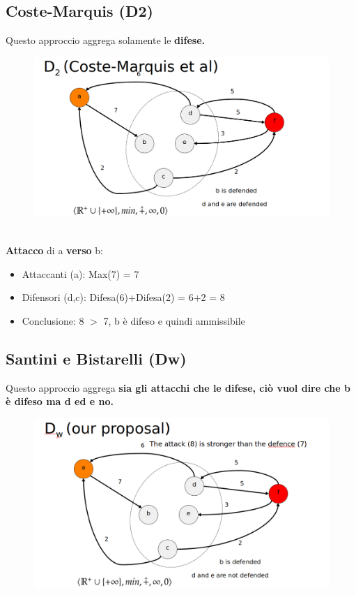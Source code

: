     \subsection{Coste-Marquis (D2)}
    Questo approccio aggrega solamente le \textbf{difese.}
    \begin{figure}[htp]
        \centering
        \includegraphics[width=13cm, keepaspectratio]{img/Cap6/marquis2.png}
    \end{figure}
    \\\textbf{Attacco} di a \textbf{verso} b:
    \begin{itemize}
        \item Attaccanti (a): Max(7) = 7
        \item Difensori (d,c): Difesa(6)+Difesa(2) = 6+2 = 8
        \item Conclusione: 8 $>$ 7, b è difeso e quindi ammissibile
    \end{itemize}

    \subsection{Santini e Bistarelli (Dw)}
    Questo approccio aggrega \textbf{sia gli attacchi che le difese, ciò vuol
        dire che b è difeso ma d ed e no.}

    \begin{figure}[htp]
        \centering
        \includegraphics[width=13cm, keepaspectratio]{img/Cap6/bistarelli2.png}
    \end{figure}

